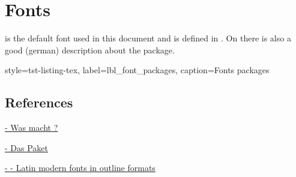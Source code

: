 \section{Fonts}
 is the default font used in this document and is defined in
. On \href{https://texwelt.de/wissen/fragen/5537/was-macht-eigentlich-usepackaget1fontenc}
{} there is also a good (german) description about the
 package.
\begin{sscodeenv_default}{%
    style=tst-listing-tex,%
    label=lbl_font_packages,%
    caption=Fonts packages}
    \RequirePackage[T1]{fontenc}
    \RequirePackage{lmodern}
\end{sscodeenv_default}

\subsection{References}
\begin{tst-default-list}
    \item{\href{https://texwelt.de/wissen/fragen/5537/was-macht-eigentlich-usepackaget1fontenc}
        { - Was macht ?}
    }
    \item{\href{https://www.namsu.de/Extra/pakete/Lmodern.html}
        { - Das  Paket}
    }
    \item{\href{https://ctan.org/pkg/lm}
        { -  - Latin modern fonts in outline formats}
    }
\end{tst-default-list}
